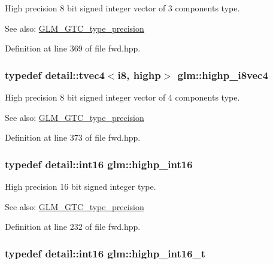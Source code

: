 High precision 8 bit signed integer vector of 3 components type. \begin{Desc}
\item[See also:]\hyperlink{group__gtc__type__precision}{GLM\_\-GTC\_\-type\_\-precision} \end{Desc}


Definition at line 369 of file fwd.hpp.\hypertarget{group__gtc__type__precision_g283b2f580a4bd7207d27418ef4a1068b}{
\subsubsection[highp\_\-i8vec4]{\setlength{\rightskip}{0pt plus 5cm}typedef detail::tvec4$<$i8, highp$>$ {\bf glm::highp\_\-i8vec4}}}
\label{group__gtc__type__precision_g283b2f580a4bd7207d27418ef4a1068b}


High precision 8 bit signed integer vector of 4 components type. \begin{Desc}
\item[See also:]\hyperlink{group__gtc__type__precision}{GLM\_\-GTC\_\-type\_\-precision} \end{Desc}


Definition at line 373 of file fwd.hpp.\hypertarget{group__gtc__type__precision_gf0430ed80e88c0d1dfbe47f359659c81}{
\subsubsection[highp\_\-int16]{\setlength{\rightskip}{0pt plus 5cm}typedef detail::int16 {\bf glm::highp\_\-int16}}}
\label{group__gtc__type__precision_gf0430ed80e88c0d1dfbe47f359659c81}


High precision 16 bit signed integer type. \begin{Desc}
\item[See also:]\hyperlink{group__gtc__type__precision}{GLM\_\-GTC\_\-type\_\-precision} \end{Desc}


Definition at line 232 of file fwd.hpp.\hypertarget{group__gtc__type__precision_g07d318d61472e75238e53b9642227672}{
\subsubsection[highp\_\-int16\_\-t]{\setlength{\rightskip}{0pt plus 5cm}typedef detail::int16 {\bf glm::highp\_\-int16\_\-t}}}
\label{group__gtc__type__precision_g07d318d61472e75238e53b9642227672}



